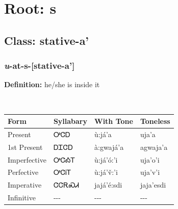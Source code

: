 \needspace{4in}
\section*{Root: s}
\nopagebreak
{}
\needspace{3in}
\subsection*{Class: stative-a'}
\nopagebreak
\needspace{2in}
\subsubsection*{\textit{u}{-}at{-}\textbf{s}{-}[stative-a']}
\nopagebreak
\textbf{Definition: } he/she is inside it
\\[0.5em]
\begin{tabularx}{\textwidth}{l X X X}%
\toprule%
\textbf{Form}&\textbf{Syllabary}&\textbf{With Tone}&\textbf{Toneless}\\%
\midrule%
Present&ᎤᏣᎠ&ù:já’a&uja’a\\%
1st Present&ᎠᏆᏣᎠ&à:gwajá’a&agwaja’a\\%
Imperfective&ᎤᏣᎣᎢ&ù:já’ó:’i&uja’o’i\\%
Perfective&ᎤᏣᎥᎢ&ù:já’v̌:’i&uja’v’i\\%
Imperative&ᏣᏣᎡᏍᏗ&jajá’é:sdi&jaja’esdi\\%
Infinitive&{-}{-}{-}&{-}{-}{-}&{-}{-}{-}\\%
\bottomrule%
\end{tabularx}
\\[1em]